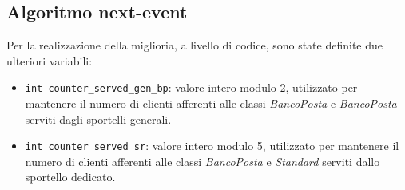 \subsection{Algoritmo next-event}
Per la realizzazione della miglioria, a livello di codice, sono state definite due ulteriori variabili:
\begin{itemize}
\item \texttt{{\color{code_purple}int} counter\_served\_gen\_bp}: valore intero modulo 2, utilizzato per mantenere il numero di clienti afferenti alle classi \uo{} \textsl{BancoPosta} e \pp{} \textsl{BancoPosta} serviti dagli sportelli generali.
\item \texttt{{\color{code_purple}int} counter\_served\_sr}: valore intero modulo 5, utilizzato per mantenere il numero di clienti afferenti alle classi \sr{} \textsl{BancoPosta} e \sr{} \textsl{Standard} serviti dallo sportello dedicato.
\end{itemize}

